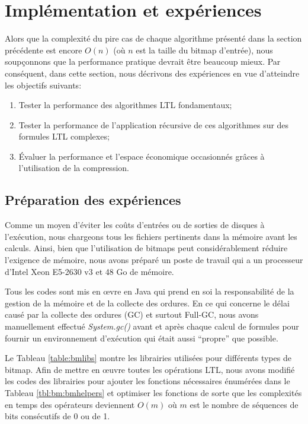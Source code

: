 

\section{Implémentation et expériences}\label{sec:bm:experiments} %

Alors que la complexité du pire cas de chaque algorithme présenté dans la section précédente est encore $O(n)$ (où $n$ est la taille du bitmap d'entrée), nous soupçonnons que la performance pratique devrait être beaucoup mieux. Par conséquent, dans cette section, nous décrivons des expériences en vue d'atteindre les objectifs suivants:

\begin{enumerate}
\item Tester la performance des algorithmes LTL fondamentaux;
\item Tester la performance de l'application récursive de ces algorithmes sur des formules LTL complexes;
\item Évaluer la performance et l'espace économique occasionnés grâces à l'utilisation de la compression.
\end{enumerate}

\subsection{Préparation des expériences} %

Comme un moyen d'éviter les coûts d'entrées ou de sorties de disques à l'exécution, nous chargeons tous les fichiers pertinents dans la mémoire avant les calculs. Ainsi, bien que l'utilisation de bitmaps peut considérablement réduire l'exigence de mémoire, nous avons préparé un poste de travail qui a un processeur d'Intel Xeon E5-2630 v3 et 48 Go de mémoire.

Tous les codes sont mis en \oe{}vre en Java qui prend en soi la responsabilité de la gestion de la mémoire et de la collecte des ordures. En ce qui concerne le délai causé par la collecte des ordures (GC) et surtout Full-GC, nous avons manuellement effectué \textit{System.gc()} avant et après chaque calcul de formules pour fournir un environnement d'exécution qui était aussi ``propre'' que possible.

Le Tableau \ref{table:bmlibs} montre les librairies utilisées pour différents types de bitmap. Afin de mettre en \oe{}uvre toutes les opérations LTL, nous avons modifié les codes des librairies pour ajouter les fonctions nécessaires énumérées dans le Tableau \ref{tbl:bm:bmhelpers} et optimiser les fonctions de sorte que les complexités en temps des opérateurs deviennent $O(m)$ où $m$ est le nombre de séquences de bits consécutifs de 0 ou de 1.


